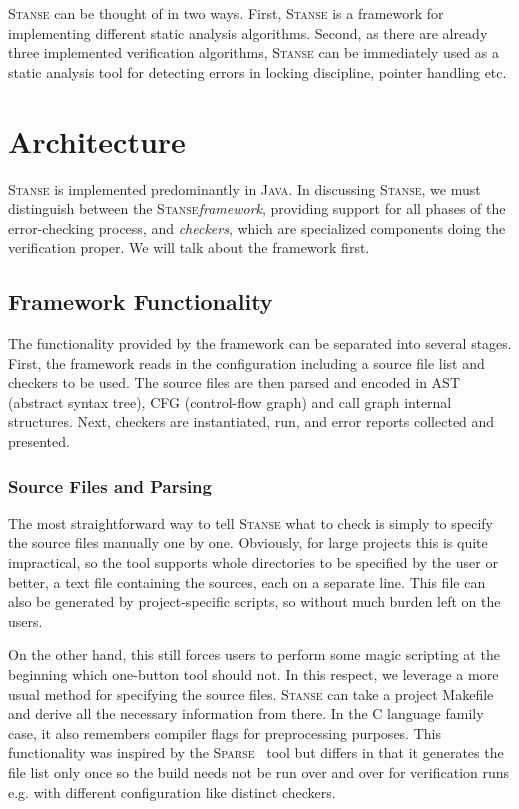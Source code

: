 \documentclass[10pt]{llncs}
\newcommand{\Stanse}{\textsc{Stanse}\xspace}
\begin{document}
\Stanse can be thought of in two ways. First, \Stanse is a framework for
implementing different static analysis algorithms. Second, as there are
already three implemented verification algorithms, \Stanse can be immediately
used as a static analysis tool for detecting errors in locking discipline,
pointer handling etc.

\section{Architecture}
\label{sec:architecture}

\Stanse is implemented predominantly in \textsc{Java}. In discussing \Stanse,
we must distinguish between the \Stanse \emph{framework}, providing support for
all phases of the error-checking process, and \emph{checkers}, which are
specialized components doing the verification proper. We will talk about the
framework first.

\subsection{Framework Functionality}
\label{sec:framework}

The functionality provided by the framework can be separated into several
stages. First, the framework reads in the configuration including a source
file list and checkers to be used. The source files are then parsed and
encoded in AST (abstract syntax tree), CFG (control-flow graph) and call graph
internal structures. Next, checkers are instantiated, run, and error reports
collected and presented.

\vspace{-.5\baselineskip}
\subsubsection{Source Files and Parsing}
The most straightforward way to tell \Stanse what to check is simply to
specify the source files manually one by one. Obviously, for large projects
this is quite impractical, so the tool supports whole directories to be
specified by the user or better, a text file containing the sources, each on a
separate line.  This file can also be generated by project-specific scripts,
so without much burden left on the users.

On the other hand, this still forces users to perform some magic scripting at
the beginning which one-button tool should not. In this respect, we leverage a
more usual method for specifying the source files.  \Stanse can take a project
\textsf{Makefile} and derive all the necessary information from there. In the
C language family case, it also remembers compiler flags for preprocessing
purposes. This functionality was inspired by the
\textsc{Sparse}~\cite{sparse} tool but differs in that it generates the file
list only once so the build needs not be run over and over for verification
runs e.g. with different configuration like distinct checkers.
\end{document}
